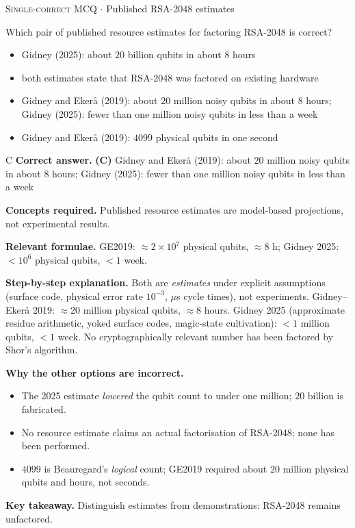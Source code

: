 \documentclass[11pt,a4paper]{article}
\newcommand{\optlabel}[1]{\textbf{(#1)}}
\newcommand{\correctlabel}[1]{\textcolor{okgreen}{\textbf{(#1)}\,\ding{51}}}
\newenvironment{qitem}[1]{\begin{list}{}{\setlength{\leftmargin}{3.3em}\setlength{\labelwidth}{3.1em}%
  \setlength{\labelsep}{0.2em}\setlength{\topsep}{3pt}\setlength{\parsep}{3pt}}\item[\textbf{Q.#1}\hfill]}{\end{list}}
\newcommand{\qsep}{\par\vspace{2pt}{\color{black!15}\hrule}\vspace{4pt}}
\newcommand{\qmeta}[2]{{\footnotesize\color{black!60}\textsc{#1} \;$\cdot$\; #2}\par}
\begin{document}
\begin{qitem}{62}
\qmeta{Single-correct MCQ}{Published RSA-2048 estimates}
Which pair of published resource estimates for factoring RSA-2048 is correct?
\begin{itemize}[leftmargin=2.6em, labelsep=0.4em, itemsep=2pt, topsep=3pt]
\item[\optlabel{A}] Gidney (2025): about $20$ billion qubits in about $8$ hours
\item[\optlabel{B}] both estimates state that RSA-2048 was factored on existing hardware
\item[\correctlabel{C}] Gidney and Ekerå (2019): about $20$ million noisy qubits in about $8$ hours; Gidney (2025): fewer than one million noisy qubits in less than a week
\item[\optlabel{D}] Gidney and Ekerå (2019): $4099$ physical qubits in one second
\end{itemize}
\end{qitem}
\begin{solbox}{C}
\textbf{\color{brand}Correct answer.} \textcolor{okgreen}{\textbf{(C)}} Gidney and Ekerå (2019): about $20$ million noisy qubits in about $8$ hours; Gidney (2025): fewer than one million noisy qubits in less than a week

\textbf{\color{brand}Concepts required.} Published resource estimates are model-based projections, not experimental results.

\textbf{\color{brand}Relevant formulae.} GE2019: $\approx2\times10^7$ physical qubits, $\approx8$ h; Gidney 2025: $<10^6$ physical qubits, $<1$ week.

\textbf{\color{brand}Step-by-step explanation.} Both are \emph{estimates} under explicit assumptions (surface code, physical error rate $10^{-3}$, $\mu$s cycle times), not experiments. Gidney--Ekerå 2019:
$\approx 20$ million physical qubits, $\approx 8$ hours. Gidney 2025 (approximate residue arithmetic, yoked surface codes, magic-state cultivation): $< 1$
million qubits, $< 1$ week. No cryptographically relevant number has been factored by Shor's algorithm.

\textbf{\color{brand}Why the other options are incorrect.}
\begin{itemize}[leftmargin=2.4em, itemsep=1pt, topsep=2pt]
\item[\textbf{(A)}] The 2025 estimate \emph{lowered} the qubit count to under one million; $20$ billion is fabricated.
\item[\textbf{(B)}] No resource estimate claims an actual factorisation of RSA-2048; none has been performed.
\item[\textbf{(D)}] $4099$ is Beauregard's \emph{logical} count; GE2019 required about $20$ million physical qubits and hours, not seconds.
\end{itemize}
\textbf{\color{brand}Key takeaway.} Distinguish estimates from demonstrations: RSA-2048 remains unfactored.
\end{solbox}
\qsep
\end{document}
